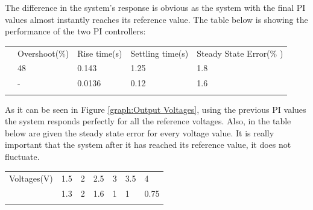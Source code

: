 \documentclass[a4paper]{article}
\begin{document}
The difference in the system's response is obvious as the system with the final PI values almost instantly reaches its reference value.
The table below is showing the performance of the two PI controllers:





\begin{table}[H]
 			\centering
\begin{tabular}{p{0.83in}p{0.99in}p{0.84in}p{0.84in}p{0.84in}}
\hline
\multicolumn{1}{|p{0.83in}}{} & 
\multicolumn{1}{|p{0.99in}}{Overshoot($\%$)} & 
\multicolumn{1}{|p{0.84in}}{Rise time(s)} & 
\multicolumn{1}{|p{0.84in}}{Settling time(s)} & 
\multicolumn{1}{|p{0.84in}|}{Steady State Error($\%$ )} \\
\hhline{-----}
\multicolumn{1}{|p{0.83in}}{Initial} & 
\multicolumn{1}{|p{0.99in}}{48} & 
\multicolumn{1}{|p{0.84in}}{0.143} & 
\multicolumn{1}{|p{0.84in}}{1.25} & 
\multicolumn{1}{|p{0.84in}|}{1.8} \\
\hhline{-----}
\multicolumn{1}{|p{0.83in}}{Final} & 
\multicolumn{1}{|p{0.99in}}{-} & 
\multicolumn{1}{|p{0.84in}}{0.0136} & 
\multicolumn{1}{|p{0.84in}}{0.12} & 
\multicolumn{1}{|p{0.84in}|}{1.6} \\
\hhline{-----}

\end{tabular}
 \end{table}






As it can be seen in Figure \ref{graph:Output Voltages}, using the previous PI values the system 
responds perfectly for all the reference voltages. Also, in the table below are 
given the steady state error for every voltage value. It is really important 
that the system after it has reached its reference value, it does not fluctuate. 






\begin{table}[H]
 			\centering
\begin{tabular}{p{0.73in}p{0.68in}p{0.68in}p{0.68in}p{0.68in}p{0.68in}p{0.69in}}
\hline
\multicolumn{1}{|p{0.80in}}{Voltages(V)} & 
\multicolumn{1}{|p{0.68in}}{1.5} & 
\multicolumn{1}{|p{0.68in}}{2} & 
\multicolumn{1}{|p{0.68in}}{2.5} & 
\multicolumn{1}{|p{0.68in}}{3} & 
\multicolumn{1}{|p{0.68in}}{3.5} & 
\multicolumn{1}{|p{0.69in}|}{4} \\
\hhline{-------}
\multicolumn{1}{|p{0.80in}}{Steady State Error} & %
\multicolumn{1}{|p{0.68in}}{1.3} & 
\multicolumn{1}{|p{0.68in}}{2} & 
\multicolumn{1}{|p{0.68in}}{1.6} & 
\multicolumn{1}{|p{0.68in}}{1} & 
\multicolumn{1}{|p{0.68in}}{1} & 
\multicolumn{1}{|p{0.69in}|}{0.75} \\
\hhline{-------}

\end{tabular}
 \end{table}
\end{document}
